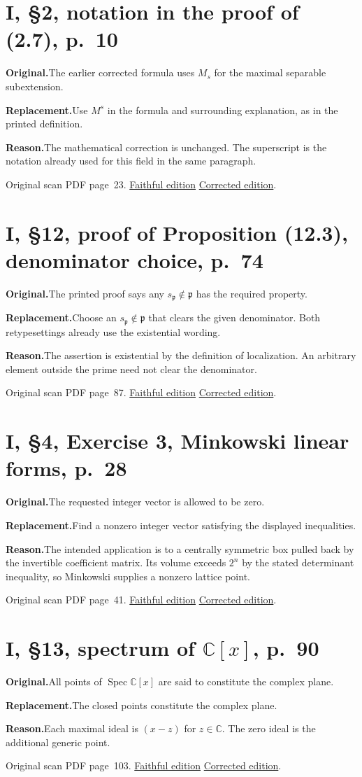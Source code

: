 \documentclass[11pt,a4paper]{article}
\newcommand{\original}{\par\smallskip\noindent\textbf{Original.}\enspace}
\newcommand{\replacement}{\par\smallskip\noindent\textbf{Replacement.}\enspace}
\newcommand{\reason}{\par\smallskip\noindent\textbf{Reason.}\enspace}
\newcommand{\editionlink}[3]{\href{#1\#errata.#2}{#3}}
\newcommand{\location}[2]{%
  \par\smallskip\noindent Original scan PDF page~#2.\enspace
  \editionlink{Neukirch_Faithful.pdf}{#1}{Faithful edition}
  \quad\editionlink{Neukirch_Corrected.pdf}{#1}{Corrected edition}.}
\begin{document}
\setcounter{section}{60}
\section{I, \S2, notation in the proof of (2.7), p.~10}\label{errata:item:61}

\original The earlier corrected formula uses $M_s$ for the maximal separable subextension.
\replacement Use $M^s$ in the formula and surrounding explanation, as in the printed definition.
\reason The mathematical correction is unchanged. The superscript is the notation already used for this field in the same paragraph.
\location{61}{23}

\setcounter{section}{61}
\section{I, \S12, proof of Proposition (12.3), denominator choice, p.~74}\label{errata:item:62}

\original The printed proof says any $s_{\mathfrak p}\notin\mathfrak p$ has the required property.
\replacement Choose an $s_{\mathfrak p}\notin\mathfrak p$ that clears the given denominator. Both retypesettings already use the existential wording.
\reason The assertion is existential by the definition of localization. An arbitrary element outside the prime need not clear the denominator.
\location{62}{87}

\setcounter{section}{62}
\section{I, \S4, Exercise 3, Minkowski linear forms, p.~28}\label{errata:item:63}

\original The requested integer vector is allowed to be zero.
\replacement Find a nonzero integer vector satisfying the displayed inequalities.
\reason The intended application is to a centrally symmetric box pulled back by the invertible coefficient matrix. Its volume exceeds $2^n$ by the stated determinant inequality, so Minkowski supplies a nonzero lattice point.
\location{63}{41}

\setcounter{section}{63}
\section{I, \S13, spectrum of $\mathbb C[x]$, p.~90}\label{errata:item:64}

\original All points of $\operatorname{Spec}\mathbb C[x]$ are said to constitute the complex plane.
\replacement The closed points constitute the complex plane.
\reason Each maximal ideal is $(x-z)$ for $z\in\mathbb C$. The zero ideal is the additional generic point.
\location{64}{103}
\end{document}
